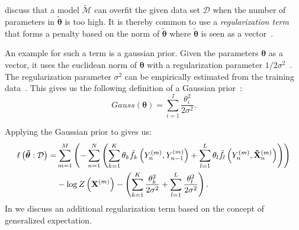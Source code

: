 \bigskip

\citet{sutton2010introduction} discuss that a model $\tilde{\mathcal{M}}$ can overfit the given data set $\mathcal{D}$ when the number of parameters in $\bm{\tilde{\theta}}$ is too high.
It is thereby common to use a \textit{regularization term} that forms a penalty based on the norm of $\bm{\tilde{\theta}}$ where $\bm{\tilde{\theta}}$ is seen as a vector~\citep{koller2009probabilistic,sutton2010introduction}.

An example for such a term is a \gls{gaussian prior}.
Given the parameters $\bm{\theta}$ as a vector, it uses the \gls{euclidean norm} of $\bm{\theta}$ with a \gls{regularization parameter} $1/2\sigma^2$~\citep{sutton2010introduction}.
The \gls{regularization parameter} $\sigma^2$ can be empirically estimated from the training data~\citep{chen1999gaussian}.
This gives us the following definition of a Gaussian prior~\citep{sutton2010introduction}:
\begin{equation}
  \label{equ:gaussian-prior}
  Gauss(\bm{\theta})=\sum_{i=1}^I\frac{\theta_i^2}{2\sigma^2}.
\end{equation}

Applying the Gaussian prior to  gives us:
\begin{equation}
  \label{equ:log-likelihood-linear-chain-crf-log-linear-gaussian}
  \begin{split}
    \ell\left(\bm{\tilde{\theta}}:\mathcal{D}\right) = & \sum_{m=1}^M \left(-\sum_{n=1}^N \left(\sum_{k=1}^K\theta_k \tilde{f}_k\left(\vphantom{\tilde{X}}Y_n^{(m)},Y_{n-1}^{(m)}\right)+\sum_{l=1}^L\theta_l \tilde{f}_l\left(Y_n^{(m)},\mathbf{\tilde{X}}_n^{(m)}\right)\right)\right) \\
    & -\log Z\left(\mathbf{X}^{(m)}\right)-\left(\sum_{k=1}^K\frac{\theta_k^2}{2\sigma^2}+\sum_{l=1}^L\frac{\theta_l^2}{2\sigma^2}\right).
 \end{split}
\end{equation}
In  we discuss an additional regularization term based on the concept of \gls{generalized expectation}.

\bigskip

